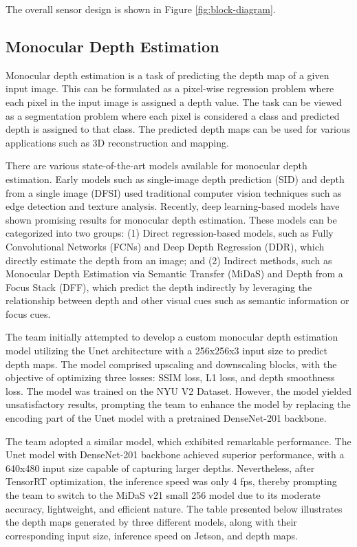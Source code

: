 \documentclass[conference]{IEEEtran}
\begin{document}
The overall sensor design is shown in Figure \ref{fig:block-diagram}.

\FloatBarrier

\subsection{Monocular Depth Estimation}
Monocular depth estimation is a task of predicting the depth map of a given input image. This can be formulated as a pixel-wise regression problem where each pixel in the input image is assigned a depth value. The task can be viewed as a segmentation problem where each pixel is considered a class and predicted depth is assigned to that class. The predicted depth maps can be used for various applications such as 3D reconstruction and mapping.

There are various state-of-the-art models available for monocular depth estimation. Early models such as single-image depth prediction (SID) and depth from a single image (DFSI) used traditional computer vision techniques such as edge detection and texture analysis. Recently, deep learning-based models have shown promising results for monocular depth estimation. These models can be categorized into two groups: (1) Direct regression-based models, such as Fully Convolutional Networks (FCNs) and Deep Depth Regression (DDR), which directly estimate the depth from an image; and (2) Indirect methods, such as Monocular Depth Estimation via Semantic Transfer (MiDaS) and Depth from a Focus Stack (DFF), which predict the depth indirectly by leveraging the relationship between depth and other visual cues such as semantic information or focus cues.

The team initially attempted to develop a custom monocular depth estimation model utilizing the Unet architecture with a 256x256x3 input size to predict depth maps. The model comprised upscaling and downscaling blocks, with the objective of optimizing three losses: SSIM loss, L1 loss, and depth smoothness loss. The model was trained on the NYU V2 Dataset. However, the model yielded unsatisfactory results, prompting the team to enhance the model by replacing the encoding part of the Unet model with a pretrained DenseNet-201 backbone.

The team adopted a similar model, which exhibited remarkable performance. The Unet model with DenseNet-201 backbone achieved superior performance, with a 640x480 input size capable of capturing larger depths. Nevertheless, after TensorRT optimization, the inference speed was only 4 fps, thereby prompting the team to switch to the MiDaS v21 small 256 model due to its moderate accuracy, lightweight, and efficient nature. The table presented below illustrates the depth maps generated by three different models, along with their corresponding input size, inference speed on Jetson, and depth maps.
\end{document}
